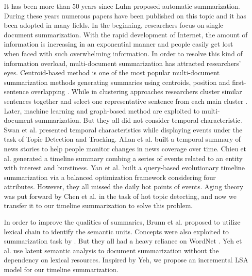 \documentclass[runningheads,a4paper]{llncs}
\begin{document}
It has been more than 50 years since Luhn \cite{1958-Luhn-p159-165} proposed automatic summarization. During these years numerous papers have been published on this topic and it has been adopted in many fields. In the beginning, researchers focus on single document summarization. With the rapid development of Internet, the amount of information is increasing in an exponential manner and people easily get lost when faced with such overwhelming information. In order to resolve this kind of information overload, multi-document summarization has attracted researchers' eyes. Centroid-based method is one of the most popular multi-document summarization methods generating summaries using centroids, position and first-sentence overlapping \cite{2004-Radev-p919-938}. While in clustering approaches researchers cluster similar sentences together and select one representative sentence from each main cluster \cite{1997-Salton-p193-207,2005-Harabagiu-p202-209}. Later, machine learning \cite{2008-Wong-p985-992} and graph-based method \cite{2004-Erkan-p365-371,2005-Mihalcea-p-} are exploited to multi-document summarization. But they all did not consider temporal characteristic.
Swan et al. \cite{2000-Swan-p49-56} presented temporal characteristics while displaying events under the task of Topic Detection and Tracking. Allan et al. \cite{2001-Allan-p10-18} built a temporal summary of news stories to help people monitor changes in news coverage over time. Chieu et al. \cite{2004-Chieu-p425-432} generated a timeline summary combing a series of events related to an entity with interest and burstiness. Yan et al.\cite{2011-Yan-p745-754} built a query-based evolutionary timeline summarization via a balanced optimization framework considering four attributes. However, they all missed the daily hot points of events. Aging theory was put forward by Chen et al. \cite{1990-Deerwester-p391-407} in the task of hot topic detecting, and now we transfer it to our timeline summarization to solve this problem.

In order to improve the qualities of summaries, Brunn et al. \cite{2001-Brunn-p-} proposed to utilize lexical chain to identify the semantic units. Concepts were also exploited to summarization task by \cite{2007-Ye-p1643-1662}. But they all had a heavy reliance on WordNet \cite{1990-Miller-p235-244}. Yeh et al. \cite{2001-Gong-p19-25} use latent semantic analysis to document summarization without the dependency on lexical resources. Inspired by Yeh, we propose an incremental LSA model for our timeline summarization. 
\end{document}
